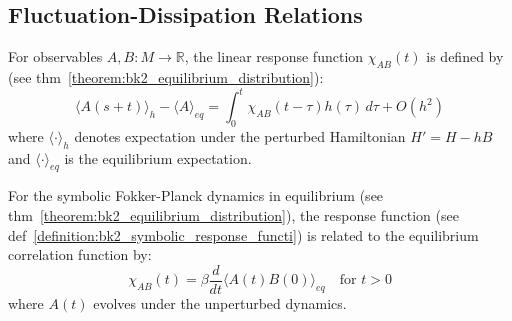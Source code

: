 \subsection{Fluctuation-Dissipation Relations}
\label{subsec:bk2_symbolic_fluctuation_dissipation_relations}

\begin{definition} 
\label{definition:bk2_symbolic_response_functi} 
For observables $A, B: M \to \mathbb{R}$, the linear response function $\chi_{AB}(t)$ is defined by (see thm~\ref{theorem:bk2_equilibrium_distribution}):
\[
\langle A(s+t) \rangle_h - \langle A \rangle_{eq} = \int_0^t \chi_{AB}(t-\tau) h(\tau) \, d\tau + O(h^2)
\]
where $\langle \cdot \rangle_h$ denotes expectation under the perturbed Hamiltonian $H' = H - hB$ and $\langle \cdot \rangle_{eq}$ is the equilibrium expectation.
\end{definition}

\begin{theorem} 
\label{theorem:bk2_symbolic_fluctuation_dissipation_relation} 
For the symbolic Fokker-Planck dynamics in equilibrium (see thm~\ref{theorem:bk2_equilibrium_distribution}), the response function (see def~\ref{definition:bk2_symbolic_response_functi}) is related to the equilibrium correlation function by:
\[
\chi_{AB}(t) = \beta \frac{d}{dt}\langle A(t) B(0) \rangle_{eq} \quad \text{for } t > 0
\]
where $A(t)$ evolves under the unperturbed dynamics.
\end{theorem}

